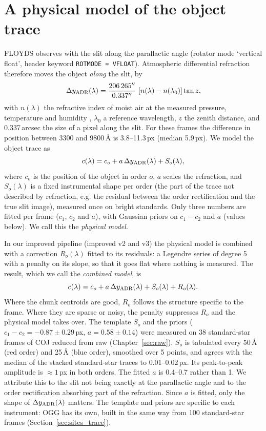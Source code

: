 \section{A physical model of the object trace}
\label{sec:traces_model}
FLOYDS observes with the slit along the parallactic angle (rotator mode `vertical float', header keyword
\texttt{ROTMODE = VFLOAT}). Atmospheric differential refraction therefore moves the object \emph{along} the slit, by
\begin{equation}
\Delta y_{\rm ADR}(\lambda)=\frac{206\,265''}{0.337''}\,\left[n(\lambda)-n(\lambda_0)\right]\tan z ,
\label{eq:adr}
\end{equation}
with $n(\lambda)$ the refractive index of moist air at the measured pressure, temperature and humidity
\citep[the formulae collected by][]{Filippenko1982}, $\lambda_0$ a reference wavelength, $z$ the zenith distance, and
0.337\,arcsec the size of a pixel along the slit. For these frames the difference in position between 3300 and
9800\,\AA{} is 3.8--11.3\,px (median 5.9\,px). We model the object trace as
\begin{equation}
c(\lambda)=c_o+a\,\Delta y_{\rm ADR}(\lambda)+S_o(\lambda),
\label{eq:tracemodel}
\end{equation}
where $c_o$ is the position of the object in order $o$, $a$ scales the refraction, and $S_o(\lambda)$ is a fixed
instrumental shape per order (the part of the trace not described by refraction, e.g. the residual between the
order rectification and the true slit image), measured once on bright standards. Only three numbers are fitted per
frame ($c_1$, $c_2$ and $a$), with Gaussian priors on $c_1-c_2$ and $a$ (values below). We call this the
\emph{physical model}.

In our improved pipeline (improved v2 and v3) the physical model is combined with a correction $R_o(\lambda)$ fitted
to its residuals: a Legendre series of degree 5 with a penalty on its slope, so that it goes flat where nothing is
measured. The result, which we call the \emph{combined model}, is
\begin{equation}
c(\lambda)=c_o+a\,\Delta y_{\rm ADR}(\lambda)+S_o(\lambda)+R_o(\lambda).
\label{eq:tracehybrid}
\end{equation}
Where the chunk centroids are good, $R_o$ follows the structure specific to the frame. Where they are sparse or
noisy, the penalty suppresses $R_o$ and the physical model takes over. The template $S_o$ and the priors
($c_1-c_2=-0.87\pm0.29$\,px, $a=0.58\pm0.14$) were measured on 38 standard-star frames of COJ reduced from raw
(Chapter~\ref{sec:raw}). $S_o$ is tabulated every 50\,\AA{} (red order) and 25\,\AA{} (blue order), smoothed over 5
points, and agrees with the median of the stacked standard-star traces to 0.01--0.02\,px. Its peak-to-peak amplitude
is $\approx1$\,px in both orders. The fitted $a$ is 0.4--0.7 rather than 1. We attribute this to the slit not being
exactly at the parallactic angle and to the order rectification absorbing part of the refraction. Since $a$ is
fitted, only the shape of $\Delta y_{\rm ADR}(\lambda)$ matters. The template and priors are specific to each
instrument: OGG has its own, built in the same way from 100 standard-star frames (Section~\ref{sec:sites_trace}).

